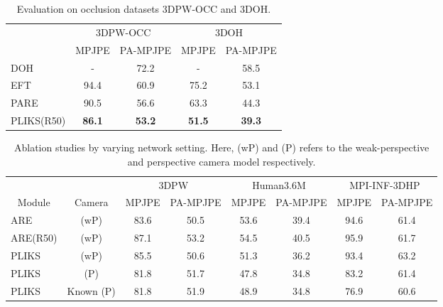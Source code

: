 \documentclass[10pt,twocolumn,letterpaper]{article}
\newcommand{\myrowcolour}{\rowcolor[gray]{0.925}}
\begin{document}
\begin{table}[b]
\footnotesize

\centering
\begin{tabular}{l|cc|cc}
     & \multicolumn{2}{c|}{3DPW-OCC}         & \multicolumn{2}{c}{3DOH}              \\ \cline{2-5} 
     & \multicolumn{1}{c|}{MPJPE} & PA-MPJPE & \multicolumn{1}{c|}{MPJPE} & PA-MPJPE \\ \hline
DOH~\cite{3doh}  & \multicolumn{1}{c|}{-}      & 72.2     & \multicolumn{1}{c|}{-}     & 58.5     \\\myrowcolour
EFT~\cite{eft}  & \multicolumn{1}{c|}{94.4}  & 60.9     & \multicolumn{1}{c|}{75.2}  & 53.1     \\ 
PARE~\cite{pare} & \multicolumn{1}{c|}{90.5}  & 56.6     & \multicolumn{1}{c|}{63.3}  & 44.3     \\ \myrowcolour \hline
PLIKS(R50) & \multicolumn{1}{c|}{\textbf{86.1}}  & \textbf{53.2}     & \multicolumn{1}{c|}{\textbf{51.5}}  & \textbf{39.3}    \\ \hline
\end{tabular}\caption{\label{tab:occ}Evaluation on occlusion datasets 3DPW-OCC and 3DOH.}
\end{table}

\begin{table*}[ht]

\centering
\footnotesize
\begin{tabular}{lc|cc|cc|cc}
\multicolumn{2}{c|}{} & \multicolumn{2}{c|}{3DPW} & \multicolumn{2}{c|}{Human3.6M} & \multicolumn{2}{c}{MPI-INF-3DHP} \\ \cline{3-8} 
\multicolumn{1}{c|}{Module} & Camera                   & MPJPE & PA-MPJPE & MPJPE & PA-MPJPE & MPJPE & PA-MPJPE \\ \hline
\multicolumn{1}{l|}{ARE}    & (wP)                    & 83.6  & 50.5     & 53.6  & 39.4     & 94.6  & 61.4     \\
\multicolumn{1}{l|}{ARE(R50)}    & (wP)                    & 87.1  &   53.2   & 54.5  & 40.5     & 95.9  & 61.7     \\ \hline
\multicolumn{1}{l|}{PLIKS}  & (wP)                    & 85.5  & 50.6     & 51.3  & 36.2     & 93.4  & 63.2     \\ \hline
\multicolumn{1}{l|}{PLIKS}  &  (P)& 81.8  & 51.7     & 47.8 & 34.8    & 83.2  & 61.4     \\ 
\multicolumn{1}{l|}{PLIKS}  & Known (P) & 81.8  & 51.9     & 48.9 & 34.8    & 76.9 & 60.6    \\\hline
\end{tabular}\caption{\label{tab:abalation}Ablation studies by varying network setting. Here, (wP) and (P) refers to the weak-perspective and perspective camera model respectively.} 
\end{table*}
\end{document}
